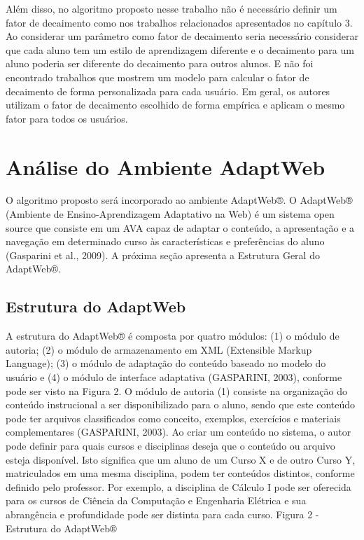 Além disso, no algoritmo proposto nesse trabalho não é necessário definir um fator de decaimento como nos trabalhos
relacionados apresentados no capítulo 3. Ao considerar um parâmetro como fator de decaimento seria necessário considerar
que cada aluno tem um estilo de aprendizagem diferente e o decaimento para um aluno poderia ser diferente do decaimento
para outros alunos. E não foi encontrado trabalhos que mostrem um modelo para calcular o fator de decaimento de forma
personalizada para cada usuário. Em geral, os autores utilizam o fator de decaimento escolhido de forma empírica e
aplicam o mesmo fator para todos os usuários.

\section{Análise do Ambiente AdaptWeb\textsuperscript{\textregistered}}

O algoritmo proposto será incorporado ao ambiente AdaptWeb®. O AdaptWeb® (Ambiente de Ensino-Aprendizagem Adaptativo na Web) é um sistema open source que consiste em um AVA capaz de adaptar o conteúdo, a apresentação e a navegação em determinado curso às características e preferências do aluno (Gasparini et al., 2009). A próxima seção apresenta a Estrutura Geral do AdaptWeb®.

\subsection{Estrutura do AdaptWeb\textsuperscript{\textregistered}}

A estrutura do AdaptWeb® é composta por quatro módulos: (1) o módulo de autoria; (2) o módulo de armazenamento em XML (Extensible Markup Language); (3) o módulo de adaptação do conteúdo baseado no modelo do usuário e (4) o módulo de interface adaptativa (GASPARINI, 2003), conforme pode ser visto na Figura 2.
O módulo de autoria (1) consiste na organização do conteúdo instrucional a ser disponibilizado para o aluno, sendo que este conteúdo pode ter arquivos classificados como conceito, exemplos, exercícios e materiais complementares (GASPARINI, 2003). Ao criar um conteúdo no sistema, o autor pode definir para quais cursos e disciplinas deseja que o conteúdo ou arquivo esteja disponível. Isto significa que um aluno de um Curso X e de outro Curso Y, matriculados em uma mesma disciplina, podem ter conteúdos distintos, conforme definido pelo professor. Por exemplo, a disciplina de Cálculo I pode ser oferecida para os cursos de Ciência da Computação e Engenharia Elétrica e sua abrangência e profundidade pode ser distinta para cada curso.
Figura 2 - Estrutura do AdaptWeb®

